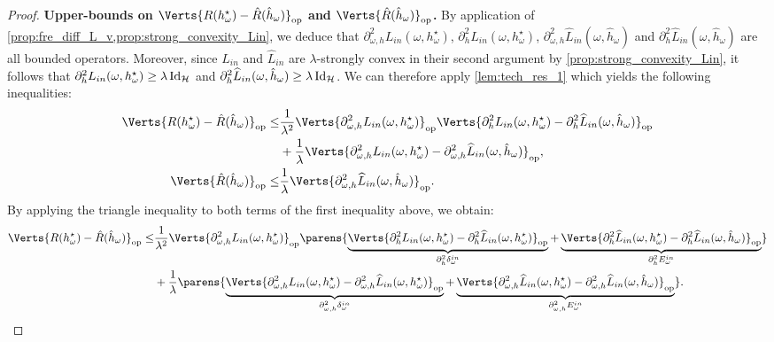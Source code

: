 \begin{proof}
    \textbf{Upper-bounds on $\Verts{R(h_{\omega}^{\star})- \hat{R}(\hat{h}_{\omega})}_{\op}$ and $\Verts{\hat{R}(\hat{h}_{\omega})}_{\op}$. } 
    By application of {\cref{prop:fre_diff_L_v,prop:strong_convexity_Lin}}, we deduce that $\partial_{\omega,h}^2 L_{in}(\omega,h_{\omega}^{\star})$, $\partial_{h}^2 L_{in}(\omega,h_{\omega}^{\star})$, $\partial_{\omega,h}^2 \widehat{L}_{in}(\omega,\hat{h}_{\omega})$ and $\partial_{h}^2 \widehat{L}_{in}(\omega,\hat{h}_{\omega})$ are all bounded operators. Moreover, since $L_{in}$ and $\widehat{L}_{in}$ are $\lambda$-strongly  convex in their second argument by {\cref{prop:strong_convexity_Lin}}, it follows that $\partial_{h}^2 L_{in}(\omega,h_{\omega}^{\star})\geq \lambda\operatorname{Id}_{\mathcal{H}}$ and $\partial_{h}^2 \widehat{L}_{in}(\omega,\hat{h}_{\omega})\geq \lambda \operatorname{Id}_{\mathcal{H}}$. We can therefore apply \cref{lem:tech_res_1} which yields the following inequalities:  
    \begin{align*}
        \Verts{R(h_{\omega}^{\star})- \hat{R}(\hat{h}_{\omega})}_{\op}
        \leq & \frac{1}{\lambda^2}\Verts{\partial_{\omega,h}^2 L_{in}(\omega,h_{\omega}^{\star})}_{\op}\Verts{\partial_{h}^2 L_{in}(\omega,h_{\omega}^{\star}) - \partial_{h}^2 \widehat{L}_{in}(\omega,\hat{h}_{\omega})}_{\op}\\ 
        &+ \frac{1}{\lambda}\Verts{\partial_{\omega,h}^2 L_{in}(\omega,h_{\omega}^{\star}) - \partial_{\omega,h}^2 \widehat{L}_{in}(\omega,\hat{h}_{\omega})}_{\op},\\
        \Verts{\hat{R}(\hat{h}_{\omega})}_{\op}\leq&\frac{1}{\lambda} \Verts{\partial_{\omega,h}^2\widehat{L}_{in}(\omega,\hat{h}_{\omega})}_{\op}. 
    \end{align*}
By applying the triangle inequality to both terms of the first inequality above, we obtain:
\begin{align*}
        \Verts{R(h_{\omega}^{\star})- \hat{R}(\hat{h}_{\omega})}_{\op}
        \leq & \frac{1}{\lambda^2}\Verts{\partial_{\omega,h}^2 L_{in}(\omega,h_{\omega}^{\star})}_{\op}\parens{\underbrace{\Verts{\partial_{h}^2 L_{in}(\omega,h_{\omega}^{\star}) - \partial_{h}^2 \widehat{L}_{in}(\omega,h^\star_{\omega})}_{\op}}_{\Dinhh} + \underbrace{\Verts{\partial_{h}^2 \widehat{L}_{in}(\omega,h_{\omega}^{\star}) - \partial_{h}^2 \widehat{L}_{in}(\omega,\hat{h}_{\omega})}_{\op}}_{\Einhh}}\\ 
        &+ \frac{1}{\lambda}\parens{\underbrace{\Verts{\partial_{\omega,h}^2 L_{in}(\omega,h_{\omega}^{\star}) - \partial_{\omega,h}^2 \widehat{L}_{in}(\omega,h_{\omega}^{\star})}_{\op}}_{\Dinwh} + \underbrace{\Verts{\partial_{\omega,h}^2 \widehat{L}_{in}(\omega,h_{\omega}^{\star}) - \partial_{\omega,h}^2 \widehat{L}_{in}(\omega,\hat{h}_{\omega})}_{\op}}_{\Einwh}}.

\end{align*}
\end{proof}
